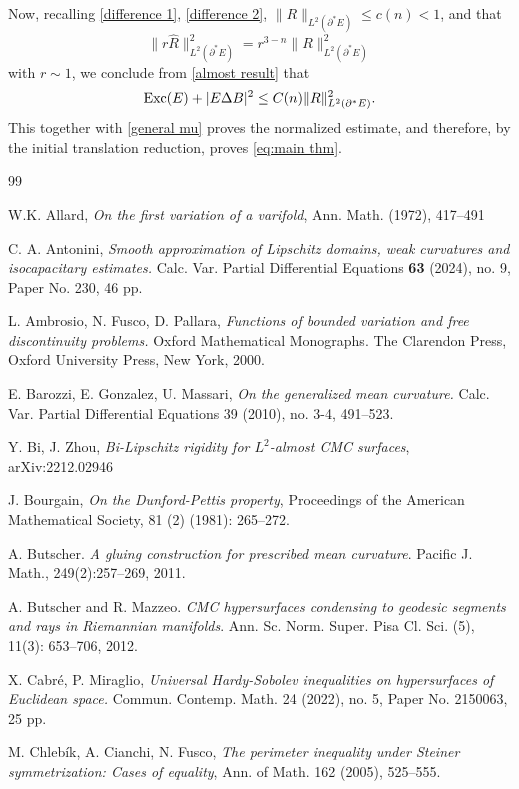 \documentclass[reqno,11pt]{amsart}
\numberwithin{equation}{section}
\theoremstyle{remark}
\begin{document}
Now, recalling \eqref{difference 1}, \eqref{difference 2}, $\| R\|_{L^2(\partial^*E)}\le c(n)<1$, and that 
\[
\|r\hat R\|_{L^2(\partial^*\hat E)}^2
=r^{3-n}\|R\|_{L^2(\partial^*E)}^2
\]
with $r\sim1$, we conclude from \eqref{almost result} that
$$ {\rm Exc}( E) +| E\Delta B|^2 \le  C(n)     \| R\|^2_{L^2(\partial^*E)}. $$
This together with \eqref{general mu} proves the normalized estimate, and
therefore, by the initial translation reduction, proves \eqref{eq:main thm}.


\begin{thebibliography}{99}

W.K. Allard,  \emph{On the first variation of a varifold}, Ann. Math.  (1972), 417--491

C. A. Antonini,
\emph{Smooth approximation of Lipschitz domains, weak curvatures and isocapacitary estimates.}
Calc. Var. Partial Differential Equations \textbf{63} (2024), no. 9, Paper No. 230, 46 pp.


L. Ambrosio, N. Fusco, D. Pallara, 
{\it Functions of bounded variation and free discontinuity problems.}
Oxford Mathematical Monographs. The Clarendon Press, Oxford University Press, New York, 2000.

E. Barozzi, E. Gonzalez, U. Massari, 
\emph{On the generalized mean curvature.}
Calc. Var. Partial Differential Equations 39 (2010), no. 3-4, 491--523.

Y. Bi, J. Zhou,
\emph{Bi-Lipschitz rigidity for $L^2$-almost CMC surfaces}, arXiv:2212.02946 

J. Bourgain,  \emph{On the Dunford-Pettis property}, Proceedings of the American Mathematical Society, 81 (2) (1981): 265--272. 

 A. Butscher. \emph{A gluing construction for prescribed mean curvature}. Pacific J. Math.,
 249(2):257--269, 2011.

 A. Butscher and R. Mazzeo. \emph{CMC hypersurfaces condensing to geodesic segments
 and rays in Riemannian manifolds}. Ann. Sc. Norm. Super. Pisa Cl. Sci. (5), 11(3):
 653--706, 2012.

X. Cabr\'e, P. Miraglio, 
\emph{Universal Hardy-Sobolev inequalities on hypersurfaces of Euclidean space.} 
Commun. Contemp. Math. 24 (2022), no. 5, Paper No. 2150063, 25 pp.

M. Chleb\'ik, A. Cianchi, N. Fusco, \emph{The perimeter inequality under Steiner symmetrization: Cases of equality},
Ann. of Math. 162 (2005), 525--555.


\end{thebibliography}
\end{document}

